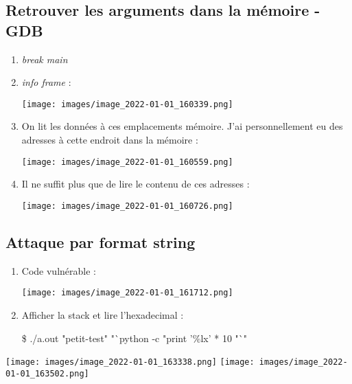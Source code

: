 \documentclass[a4paper]{article}
\begin{document}
\subsection{Retrouver les arguments dans la mémoire - GDB}
\begin{enumerate}
    \item \emph{break main}
    \item \emph{info frame} :
    \begin{center}
        \texttt{[image: images/image\_2022-01-01\_160339.png]}
    \end{center}
    \item On lit les données à ces emplacements mémoire. J'ai personnellement eu des adresses à cette endroit dans la mémoire :
    \begin{center}
        \texttt{[image: images/image\_2022-01-01\_160559.png]}
    \end{center}
    \item Il ne suffit plus que de lire le contenu de ces adresses :
    \begin{center}
        \texttt{[image: images/image\_2022-01-01\_160726.png]}
    \end{center}
\end{enumerate}

\subsection{Attaque par format string}
\begin{enumerate}
    \item Code vulnérable :
    \begin{center}
        \texttt{[image: images/image\_2022-01-01\_161712.png]}
    \end{center}
    \item Afficher la stack et lire l'hexadecimal :
    \begin{example}
    \$ ./a.out "petit-test" "`python -c "print '\%lx' * 10 "`" 
    \end{example}
\end{enumerate}
\begin{center}
        \texttt{[image: images/image\_2022-01-01\_163338.png]}
        \texttt{[image: images/image\_2022-01-01\_163502.png]}
\end{center}
\end{document}
